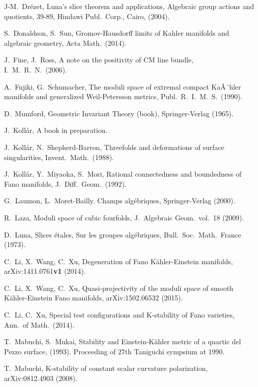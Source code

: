 \documentclass[12pt]{amsart}
\theoremstyle{remark}
\theoremstyle{definition}
\begin{document}
\begin{thebibliography}{FGA}
J-M.~Dr\'ezet, Luna's slice theorem and applications, 
Algebraic group actions and quotients, 39-89, Hindawi Publ.\ Corp., Cairo, 
(2004). 

S.~Donaldson, S.~Sun, 
Gromov-Hausdorff limits of Kahler manifolds and algebraic geometry, 
Acta Math.\ (2014). 

J.~Fine, J.~Ross, 
A note on the positivity of CM line bundle, 
I.\ M.\ R.\ N.\ (2006). 

A.~Fujiki, G.~Schumacher, 
The moduli space of extremal compact KaÂ¨hler manifolds and generalized Weil-Petersson metrics, Publ.\ R.\ I.\ M.\ S.\ (1990). 

D.~Mumford, Geometric Invariant Theory (book), 
Springer-Verlag (1965). 

J.~Koll\'ar, 
A book in preparation. 

J.~Koll\'ar, N.~Shepherd-Barron, 
Threefolds and deformations of surface singularities, 
Invent.\ Math.\ (1988). 

J.~Koll\'ar, Y.~Miyaoka, S.~Mori, 
Rational connectedness and boundedness of Fano manifolds, 
J.\ Diff.\ Geom.\ (1992). 

G.~Laumon, L.~Moret-Bailly. Champs alg\'{e}briques, 
Springer-Verlag (2000). 

R.~Laza, 
Moduli space of cubic fourfolds, 
J.\ Algebraic Geom.\ vol.\ 18 (2009). 

D.~Luna, 
Slices \'{e}tales, Sur les groupes alg\'{e}briques, 
Bull.\ Soc.\ Math.\ France (1973). 

 C.~Li, X.~Wang, C.~Xu, 
Degeneration of Fano K\"ahler-Einstein manifolds, 
arXiv:1411.0761\textbf{v1} (2014). 

 C.~Li, X.~Wang, C.~Xu, 
Quasi-projectivity of the moduli space of smooth K\"ahler-Einstein Fano manifolds, 
arXiv:1502.06532 (2015). 

C.~Li, C.~Xu, 
Special test configurations and K-stability of Fano varieties, 
Ann.\ of Math.\ (2014). 

T.~Mabuchi, S.~Mukai, 
Stability and Einstein-K\"{a}hler metric of a quartic del Pezzo surface, 
(1993). Proceeding of $27$th Taniguchi sympsium at 1990. 

T.~Mabuchi, 
K-stability of constant scalar curvature polarization, 
arXiv:0812.4903 (2008). 


\end{thebibliography}
\end{document}
